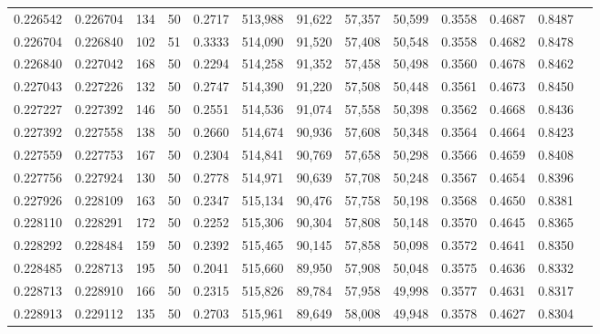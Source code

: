 \begin{tabular}{rrrrrrrrrrrrr}
0.226542 & 0.226704 &   134 &  50 &                                     0.2717 & 513,988 &  91,622 &  57,357 &  50,599 & 0.3558 & 0.4687 & 0.8487 \\
0.226704 & 0.226840 &   102 &  51 &                                     0.3333 & 514,090 &  91,520 &  57,408 &  50,548 & 0.3558 & 0.4682 & 0.8478 \\
0.226840 & 0.227042 &   168 &  50 &                                     0.2294 & 514,258 &  91,352 &  57,458 &  50,498 & 0.3560 & 0.4678 & 0.8462 \\
0.227043 & 0.227226 &   132 &  50 &                                     0.2747 & 514,390 &  91,220 &  57,508 &  50,448 & 0.3561 & 0.4673 & 0.8450 \\
0.227227 & 0.227392 &   146 &  50 &                                     0.2551 & 514,536 &  91,074 &  57,558 &  50,398 & 0.3562 & 0.4668 & 0.8436 \\
0.227392 & 0.227558 &   138 &  50 &                                     0.2660 & 514,674 &  90,936 &  57,608 &  50,348 & 0.3564 & 0.4664 & 0.8423 \\
0.227559 & 0.227753 &   167 &  50 &                                     0.2304 & 514,841 &  90,769 &  57,658 &  50,298 & 0.3566 & 0.4659 & 0.8408 \\
0.227756 & 0.227924 &   130 &  50 &                                     0.2778 & 514,971 &  90,639 &  57,708 &  50,248 & 0.3567 & 0.4654 & 0.8396 \\
0.227926 & 0.228109 &   163 &  50 &                                     0.2347 & 515,134 &  90,476 &  57,758 &  50,198 & 0.3568 & 0.4650 & 0.8381 \\
0.228110 & 0.228291 &   172 &  50 &                                     0.2252 & 515,306 &  90,304 &  57,808 &  50,148 & 0.3570 & 0.4645 & 0.8365 \\
0.228292 & 0.228484 &   159 &  50 &                                     0.2392 & 515,465 &  90,145 &  57,858 &  50,098 & 0.3572 & 0.4641 & 0.8350 \\
0.228485 & 0.228713 &   195 &  50 &                                     0.2041 & 515,660 &  89,950 &  57,908 &  50,048 & 0.3575 & 0.4636 & 0.8332 \\
0.228713 & 0.228910 &   166 &  50 &                                     0.2315 & 515,826 &  89,784 &  57,958 &  49,998 & 0.3577 & 0.4631 & 0.8317 \\
0.228913 & 0.229112 &   135 &  50 &                                     0.2703 & 515,961 &  89,649 &  58,008 &  49,948 & 0.3578 & 0.4627 & 0.8304 \\

\end{tabular}
